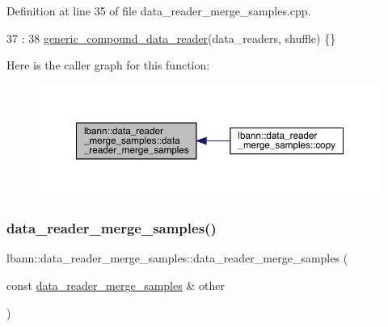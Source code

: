Definition at line 35 of file data\+\_\+reader\+\_\+merge\+\_\+samples.\+cpp.


\begin{DoxyCode}
37                 :
38   \hyperlink{classlbann_1_1generic__compound__data__reader_ab2ed3059169e556e4310a55fa99c1f07}{generic\_compound\_data\_reader}(data\_readers, shuffle) \{\}
\end{DoxyCode}
Here is the caller graph for this function\+:\nopagebreak
\begin{figure}[H]
\begin{center}
\leavevmode
\includegraphics[width=350pt]{classlbann_1_1data__reader__merge__samples_a01ff9ff7827030da41f1f6d257551260_icgraph}
\end{center}
\end{figure}
\mbox{\label{classlbann_1_1data__reader__merge__samples_aaf15afcafbcd02c21763ae6cfc6ffe01}} 
\subsubsection{\texorpdfstring{data\+\_\+reader\+\_\+merge\+\_\+samples()}{data\_reader\_merge\_samples()}\hspace{0.1cm}{\footnotesize\ttfamily [2/2]}}
{\footnotesize\ttfamily lbann\+::data\+\_\+reader\+\_\+merge\+\_\+samples\+::data\+\_\+reader\+\_\+merge\+\_\+samples (\begin{DoxyParamCaption}\item[{const \hyperlink{classlbann_1_1data__reader__merge__samples}{data\+\_\+reader\+\_\+merge\+\_\+samples} \&}]{other }\end{DoxyParamCaption})}



